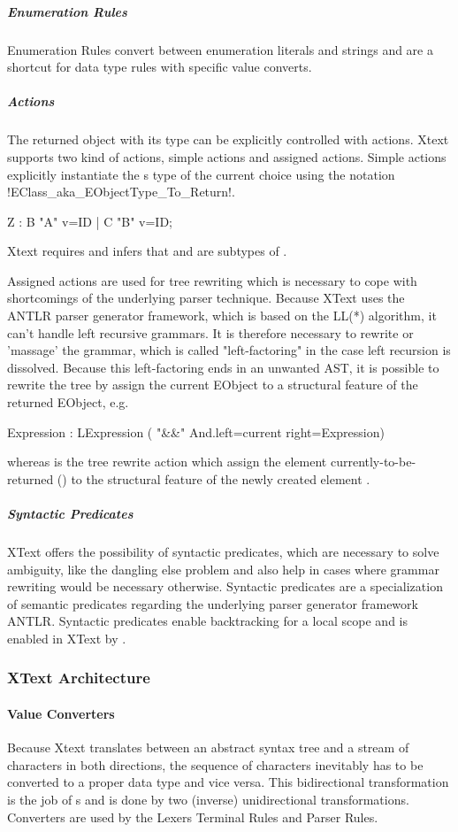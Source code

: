 \subparagraph{Enumeration Rules}
Enumeration Rules convert between enumeration literals and strings and are a shortcut for data type rules with specific value converts.

\subparagraph{Actions}
The returned object with its type can be explicitly controlled with actions. Xtext supports two kind of actions, simple actions and assigned actions. Simple actions explicitly instantiate the s type of the current choice using the notation \kode!{EClass_aka_EObjectType_To_Return}!.
\begin{xtxt}
Z 	: 	{B} "A" v=ID
	| 	{C} "B" v=ID;
\end{xtxt}
Xtext requires and infers that  and  are subtypes of . 

Assigned actions are used for tree rewriting which is necessary to cope with shortcomings of the underlying parser technique. Because XText uses the ANTLR parser generator framework, which is based on the LL(*) algorithm, it can't handle left recursive grammars. It is therefore necessary to rewrite or 'massage' the grammar, which is called "left-factoring" in the case left recursion is dissolved. Because this left-factoring ends in an unwanted AST, it is possible to rewrite the tree by assign the current EObject to a structural feature of the returned EObject, e.g. 
\begin{xtxt}
Expression 	: 	LExpression 
	 	( "&&" {And.left=current}  right=Expression)
\end{xtxt}
whereas  is the tree rewrite action which assign the element currently-to-be-returned () to the structural feature  of the newly created element .


\subparagraph{Syntactic Predicates}
XText offers the possibility of syntactic predicates, which are necessary to solve ambiguity, like the dangling else problem and also help in cases where grammar rewriting would be necessary otherwise. Syntactic predicates are a specialization of semantic predicates regarding the underlying parser generator framework ANTLR. Syntactic predicates enable backtracking for a local scope and is enabled in XText by \code{=>}.


\subsubsection{XText Architecture} \label{cha:xtextarch}

\paragraph{Value Converters}
Because Xtext translates between an abstract syntax tree and a stream of characters in both directions, the sequence of characters inevitably has to be converted to a proper data type and vice versa. This bidirectional transformation is the job of s and is done by two (inverse) unidirectional transformations. Converters are used by the Lexers Terminal Rules and Parser Rules.


